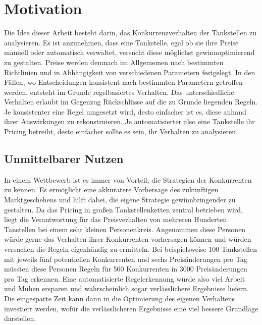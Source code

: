 \section{Motivation}
Die Idee dieser Arbeit besteht darin, das Konkurrenzverhalten der Tankstellen zu analysieren. Es ist anzunehmen, dass eine Tankstelle, egal ob sie ihre Preise manuell oder automatisch verwaltet, versucht diese möglichst gewinnoptimierend zu gestalten. Preise werden demnach im Allgemeinen nach bestimmten Richtlinien und in Abhängigkeit von verschiedenen Parametern festgelegt. In den Fällen, wo Entscheidungen konsistent nach bestimmten Parametern getroffen werden, entsteht im Grunde regelbasiertes Verhalten. Das unterschiedliche Verhalten erlaubt im Gegenzug Rückschlüsse auf die zu Grunde liegenden Regeln. Je konsistenter eine Regel umgesetzt wird, desto einfacher ist es, diese anhand ihrer Auswirkungen zu rekonstruieren. Je automatisierter also eine Tankstelle ihr Pricing betreibt, desto einfacher sollte es sein, ihr Verhalten zu analysieren.\\

\subsection{Unmittelbarer Nutzen}
In einem Wettbewerb ist es immer von Vorteil, die Strategien der Konkurrenten zu kennen. Es ermöglicht eine akkuratere Vorhersage des zukünftigen Marktgeschehens und hilft dabei, die eigene Strategie gewinnbringender zu gestalten. Da das Pricing in großen Tankstellenketten zentral betrieben wird, liegt die Verantwortung für das Preisverhalten von mehreren Hunderten Tanstellen bei einem sehr kleinen Personenkreis. Angenommen diese Personen würde gerne das Verhalten ihrer Konkurrenten vorhersagen können und würden versuchen die Regeln eigenhändig zu ermitteln. Bei beispielsweise 100 Tankstellen mit jeweils fünf potentiellen Konkurrenten und sechs Preisänderungen pro Tag müssten diese Personen Regeln für 500 Konkurrenten in 3000 Preisänderungen pro Tag erkennen. Eine automatisierte Regelerkennung würde also viel Arbeit und Mühen ersparen und wahrscheinlich sogar verlässlichere Ergebnisse liefern. Die eingesparte Zeit kann dann in die Optimierung des eigenen Verhaltens investiert werden, wofür die verlässlicheren Ergebnisse eine viel bessere Grundlage darstellen.\\


